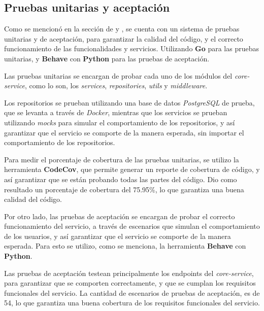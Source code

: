 \subsection{Pruebas unitarias y aceptación}

Como se mencionó en la sección de  y , se cuenta con un sistema de pruebas unitarias y de 
aceptación, para garantizar la calidad del código, y el correcto funcionamiento de las funcionalidades y servicios.
Utilizando \textbf{Go} para las pruebas unitarias, y \textbf{Behave} con \textbf{Python} para las pruebas de aceptación.
\vspace{0.25cm}

Las pruebas unitarias se encargan de probar cada uno de los módulos del \textit{core-service}, como lo son,
los \textit{services}, \textit{repositories}, \textit{utils} y \textit{middleware}.
\vspace{0.25cm}

Los repositorios se prueban utilizando una base de datos \textit{PostgreSQL} de prueba, que se levanta a través de \textit{Docker},
mientras que los servicios se prueban utilizando \textit{mocks} para simular el comportamiento de los repositorios, y así garantizar
que el servicio se comporte de la manera esperada, sin importar el comportamiento de los repositorios.
\vspace{0.25cm}

Para medir el porcentaje de cobertura de las pruebas unitarias, se utilizo la herramienta \textbf{CodeCov}, que permite 
generar un reporte de cobertura de código, y así garantizar que se están probando todas las partes del código. Dio como
resultado un porcentaje de cobertura del 75.95\%, lo que garantiza una buena calidad del código.
\vspace{0.25cm}

Por otro lado, las pruebas de aceptación se encargan de probar el correcto funcionamiento del servicio, a través de escenarios
que simulan el comportamiento de los usuarios, y así garantizar que el servicio se comporte de la manera esperada.
Para esto se utilizo, como se menciona, la herramienta \textbf{Behave} con \textbf{Python}.
\vspace{0.25cm}

Las pruebas de aceptación testean principalmente los endpoints del \textit{core-service}, para garantizar que se comporten 
correctamente, y que se cumplan los requisitos funcionales del servicio. La cantidad de escenarios de pruebas de aceptación, 
es de 54, lo que garantiza una buena cobertura de los requisitos funcionales del servicio.
\vspace{0.25cm}
